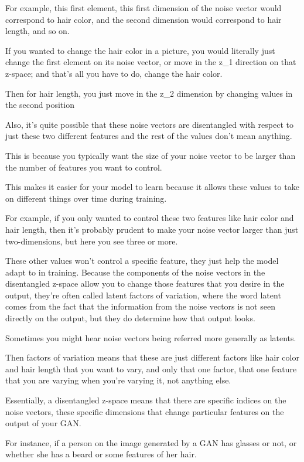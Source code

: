 \documentclass[11pt, onecolumn]{article}
\begin{document}
For example, this first element, this first dimension of the noise vector would correspond to hair color, and the second dimension would correspond to hair length, and so on.

If you wanted to change the hair color in a picture, you would literally just
change the first element on its noise vector, or move in the z_1 direction on that z-space; and that's all you have to do, change the hair color.

Then for hair length, you just move in the z_2 dimension by changing values in the second position

Also, it's quite possible that these noise vectors are disentangled with respect to just these two different features and the rest of the values don't mean anything.

This is because you typically want the size of your noise vector to be larger
than the number of features you want to control.

This makes it easier for your model to learn because it allows these values to take on different things over time during training.

For example, if you only wanted to control these two features like hair color and hair length, then it's probably prudent to make your noise vector larger than just two-dimensions, but here you see three or more.

These other values won't control a specific feature, they just help the model adapt to in training. Because the components of the noise vectors in the disentangled z-space allow you to change those features that you desire in the output, they're often called latent factors of variation, where the word latent comes from the fact that the information from the noise vectors
is not seen directly on the output, but they do determine how that output looks.

Sometimes you might hear noise vectors being referred more generally as latents.

Then factors of variation means that these are just different factors like hair color and hair length that you want to vary, and only that one factor,
that one feature that you are varying when you're varying it, not anything else.

Essentially, a disentangled z-space means that there are specific indices on the noise vectors, these specific dimensions that change particular features on the output of your GAN.

For instance, if a person on the image generated by a GAN has glasses or not,
or whether she has a beard or some features of her hair.
\end{document}
